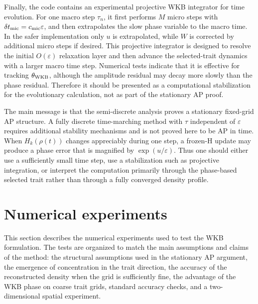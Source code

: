 \documentclass[11pt]{article}
\begin{document}
{Finally, the code contains an experimental projective WKB integrator for time evolution. For one macro step \(\tau_n\), it first performs \(M\) micro steps with \(\delta t_{\rm mic}=c_{\rm mic}\varepsilon\), and then extrapolates the slow phase variable to the macro time. In the safer implementation only \(u\) is extrapolated, while \(W\) is corrected by additional micro steps if desired. This projective integrator is designed to resolve the initial \(O(\varepsilon)\) relaxation layer and then advance the selected-trait dynamics with a larger macro time step. Numerical tests indicate that it is effective for tracking \(\theta_{\rm WKB}\), although the amplitude residual may decay more slowly than the phase residual. Therefore it should be presented as a computational stabilization for the evolutionary calculation, not as part of the stationary AP proof.

The main message is that the semi-discrete analysis proves a stationary fixed-grid AP structure. A fully discrete time-marching method with \(\tau\) independent of \(\varepsilon\) requires additional stability mechanisms and is not proved here to be AP in time. When \(H_k(\rho(t))\) changes appreciably during one step, a frozen-H update may produce a phase error that is magnified by \(\exp(u/\varepsilon)\). Thus one should either use a sufficiently small time step, use a stabilization such as projective integration, or interpret the computation primarily through the phase-based selected trait rather than through a fully converged density profile.
}




\section{Numerical experiments}\label{sec:numerics}

This section describes the numerical experiments used to test the WKB formulation.  The tests are organized to match the main assumptions and claims of the method: the structural assumptions used in the stationary AP argument, the emergence of concentration in the trait direction, the accuracy of the reconstructed density when the grid is sufficiently fine, the advantage of the WKB phase on coarse trait grids, standard accuracy checks, and a two-dimensional spatial experiment.
\end{document}
